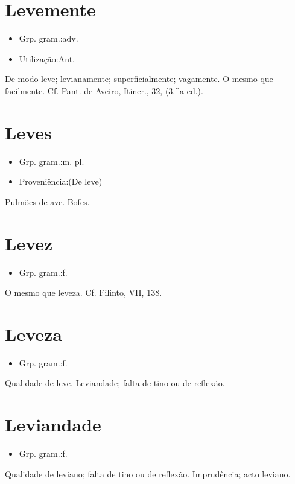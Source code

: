 \section{Levemente}
\begin{itemize}
\item {Grp. gram.:adv.}
\end{itemize}
\begin{itemize}
\item {Utilização:Ant.}
\end{itemize}
De modo leve; levianamente; superficialmente; vagamente.
O mesmo que \textunderscore facilmente\textunderscore . Cf. Pant. de Aveiro, \textunderscore Itiner.\textunderscore , 32, (3.^a ed.).
\section{Leves}
\begin{itemize}
\item {Grp. gram.:m. pl.}
\end{itemize}
\begin{itemize}
\item {Proveniência:(De \textunderscore leve\textunderscore )}
\end{itemize}
Pulmões de ave.
Bofes.
\section{Levez}
\begin{itemize}
\item {Grp. gram.:f.}
\end{itemize}
O mesmo que \textunderscore leveza\textunderscore . Cf. Filinto, VII, 138.
\section{Leveza}
\begin{itemize}
\item {Grp. gram.:f.}
\end{itemize}
Qualidade de leve.
Leviandade; falta de tino ou de reflexão.
\section{Leviandade}
\begin{itemize}
\item {Grp. gram.:f.}
\end{itemize}
Qualidade de leviano; falta de tino ou de reflexão.
Imprudência; acto leviano.
